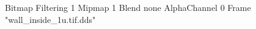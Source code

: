 {Bitmap
	{Filtering 1}
	{Mipmap 1}
	{Blend none}
	{AlphaChannel 0}
	{Frame "wall_inside_1u.tif.dds"}
}
